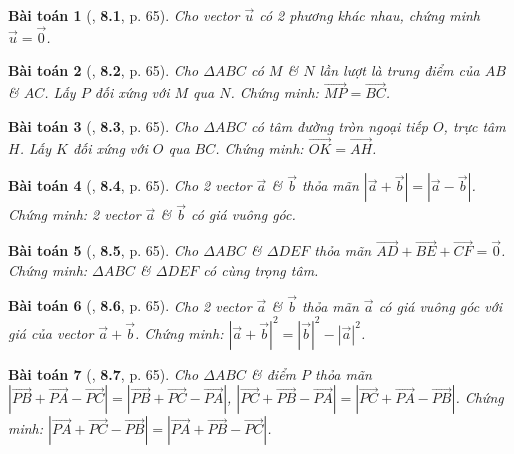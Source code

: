 \documentclass{article}
\numberwithin{equation}{section}
\newtheorem{baitoan}{Bài toán}[section]
\begin{document}
\begin{baitoan}[\cite{Hai_Hung_Thu_Tung2022_tap_1}, \textbf{8.1}, p. 65]
	Cho vector $\vec{u}$ có 2 phương khác nhau, chứng minh $\vec{u} = \vec{0}$.
\end{baitoan}

\begin{baitoan}[\cite{Hai_Hung_Thu_Tung2022_tap_1}, \textbf{8.2}, p. 65]
	Cho $\Delta ABC$ có $M$ \& $N$ lần lượt là trung điểm của $AB$ \& $AC$. Lấy $P$ đối xứng với $M$ qua $N$. Chứng minh: $\overrightarrow{MP} = \overrightarrow{BC}$.
\end{baitoan}

\begin{baitoan}[\cite{Hai_Hung_Thu_Tung2022_tap_1}, \textbf{8.3}, p. 65]
	Cho $\Delta ABC$ có tâm đường tròn ngoại tiếp $O$, trực tâm $H$. Lấy $K$ đối xứng với $O$ qua $BC$. Chứng minh: $\overrightarrow{OK} = \overrightarrow{AH}$.
\end{baitoan}

\begin{baitoan}[\cite{Hai_Hung_Thu_Tung2022_tap_1}, \textbf{8.4}, p. 65]
	Cho 2 vector $\vec{a}$ \& $\vec{b}$ thỏa mãn $|\vec{a} + \vec{b}| = |\vec{a} - \vec{b}|$. Chứng minh: 2 vector $\vec{a}$ \& $\vec{b}$ có giá vuông góc.
\end{baitoan}

\begin{baitoan}[\cite{Hai_Hung_Thu_Tung2022_tap_1}, \textbf{8.5}, p. 65]
	Cho $\Delta ABC$ \& $\Delta DEF$ thỏa mãn $\overrightarrow{AD} + \overrightarrow{BE} + \overrightarrow{CF} = \vec{0}$. Chứng minh: $\Delta ABC$ \& $\Delta DEF$ có cùng trọng tâm.
\end{baitoan}

\begin{baitoan}[\cite{Hai_Hung_Thu_Tung2022_tap_1}, \textbf{8.6}, p. 65]
	Cho 2 vector $\vec{a}$ \& $\vec{b}$ thỏa mãn $\vec{a}$ có giá vuông góc với giá của vector $\vec{a} + \vec{b}$. Chứng minh: $|\vec{a} + \vec{b}|^2 = |\vec{b}|^2 - |\vec{a}|^2$.
\end{baitoan}

\begin{baitoan}[\cite{Hai_Hung_Thu_Tung2022_tap_1}, \textbf{8.7}, p. 65]
	Cho $\Delta ABC$ \& điểm $P$ thỏa mãn $|\overrightarrow{PB} + \overrightarrow{PA} - \overrightarrow{PC}| = |\overrightarrow{PB} + \overrightarrow{PC} - \overrightarrow{PA}|$, $|\overrightarrow{PC} + \overrightarrow{PB} - \overrightarrow{PA}| = |\overrightarrow{PC} + \overrightarrow{PA} - \overrightarrow{PB}|$. Chứng minh: $|\overrightarrow{PA} + \overrightarrow{PC} - \overrightarrow{PB}| = |\overrightarrow{PA} + \overrightarrow{PB} - \overrightarrow{PC}|$.
\end{baitoan}
\end{document}
